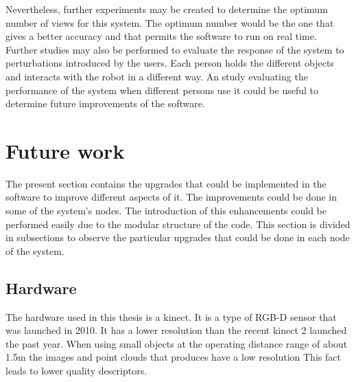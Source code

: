 	Nevertheless, further experiments may be created to determine the optimum number of views for this system. 
	The optimum number would be the one that gives a better accuracy and that permits the software to run on real time. 
	Further studies may also be performed to evaluate the response of the system to perturbations introduced by the users.
	Each person holds the different objects and interacts with the robot in a different way. 
	An study evaluating the performance of the system when different persons use it could be useful to determine future improvements of the software.  


\newpage
	\section{Future work}

	The present section contains the upgrades that could be implemented in the software to improve different aspects of it. 
	The improvements could be done in some of the system's nodes.
	The introduction of this enhancements could be performed easily due to the modular structure of the code. 
	This section is divided in subsections to observe the particular upgrades that could be done in each node of the system. 

	\subsection{Hardware}

	The hardware used in this thesis is a kinect. 
	It is a type of RGB-D sensor that was launched in 2010. 
	It has a lower resolution than the recent kinect 2 launched the past year. 
	When using small objects at the operating distance range of about 1.5m the images and point clouds that produces have a low resolution 
	This fact leads to lower quality descriptors.
	\\

